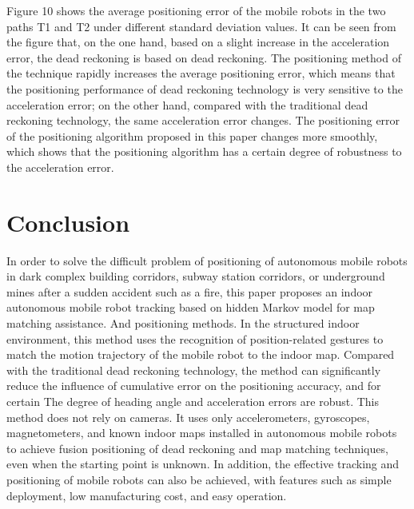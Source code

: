\documentclass{llncs}
\begin{document}
Figure 10 shows the average positioning error of the mobile robots in the two paths T1 and T2 under different standard deviation values. It can be seen from the figure that, on the one hand, based on a slight increase in the acceleration error, the dead reckoning is based on dead reckoning. The positioning method of the technique rapidly increases the average positioning error, which means that the positioning performance of dead reckoning technology is very sensitive to the acceleration error; on the other hand, compared with the traditional dead reckoning technology, the same acceleration error changes. The positioning error of the positioning algorithm proposed in this paper changes more smoothly, which shows that the positioning algorithm has a certain degree of robustness to the acceleration error.
 

\section{Conclusion}

In order to solve the difficult problem of positioning of autonomous mobile robots in dark complex building corridors, subway station corridors, or underground mines after a sudden accident such as a fire, this paper proposes an indoor autonomous mobile robot tracking based on hidden Markov model for map matching assistance. And positioning methods. In the structured indoor environment, this method uses the recognition of position-related gestures to match the motion trajectory of the mobile robot to the indoor map. Compared with the traditional dead reckoning technology, the method can significantly reduce the influence of cumulative error on the positioning accuracy, and for certain The degree of heading angle and acceleration errors are robust. This method does not rely on cameras. It uses only accelerometers, gyroscopes, magnetometers, and known indoor maps installed in autonomous mobile robots to achieve fusion positioning of dead reckoning and map matching techniques, even when the starting point is unknown. In addition, the effective tracking and positioning of mobile robots can also be achieved, with features such as simple deployment, low manufacturing cost, and easy operation. 

%
%

%
%
%

\end{document}
